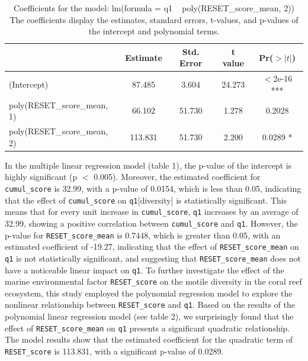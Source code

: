 \documentclass[a4paper, 11]{article}
\begin{document}
\vspace{1\baselineskip}

\begin{table}[H]
\centering
\begin{tabular}{lcccc}
\toprule
 & Estimate & Std. Error & t value & Pr($>|t|$) \\
\midrule
(Intercept) & 87.485 & 3.604 & 24.273 & $<$2e-16 *** \\
poly(RESET\_score\_mean, 1) & 66.102 & 51.730 & 1.278 & 0.2028 \\
poly(RESET\_score\_mean, 2) & 113.831 & 51.730 & 2.200 & 0.0289 * \\
\bottomrule
\end{tabular}
\caption{   Coefficients for the model: lm(formula = q1 ~ poly(RESET\_score\_mean, 2))\\ 
The coefficients display the estimates, standard errors, t-values, and p-values of the intercept and polynomial terms.}
\label{tab:model2}
\end{table}




In the multiple linear regression model (table 1), the p-value of the intercept is highly significant (p $<$ 0.005). Moreover, the estimated coefficient for \texttt{cumul\_score} is 32.99, with a p-value of 0.0154, which is less than 0.05, indicating that the effect of \texttt{cumul\_score} on \texttt{q1}[diversity] is statistically significant. This means that for every unit increase in \texttt{cumul\_score}, \texttt{q1} increases by an average of 32.99, showing a positive correlation between \texttt{cumul\_score} and \texttt{q1}. However, the p-value for \texttt{RESET\_score\_mean} is 0.7448, which is greater than 0.05, with an estimated coefficient of -19.27, indicating that the effect of \texttt{RESET\_score\_mean} on \texttt{q1} is not statistically significant, and suggesting that \texttt{RESET\_score\_mean} does not have a noticeable linear impact on \texttt{q1}. 
To further investigate the effect of the marine environmental factor \texttt{RESET\_score} on the motile diversity in the coral reef ecosystem, this study employed the polynomial regression model to explore the nonlinear relationship between \texttt{RESET\_score} and \texttt{q1}. Based on the results of the polynomial linear regression model (see table 2), we surprisingly found that the effect of \texttt{RESET\_score\_mean} on \texttt{q1} presents a significant quadratic relationship. The model results show that the estimated coefficient for the quadratic term of \texttt{RESET\_score} is 113.831, with a significant p-value of 0.0289.
\end{document}
